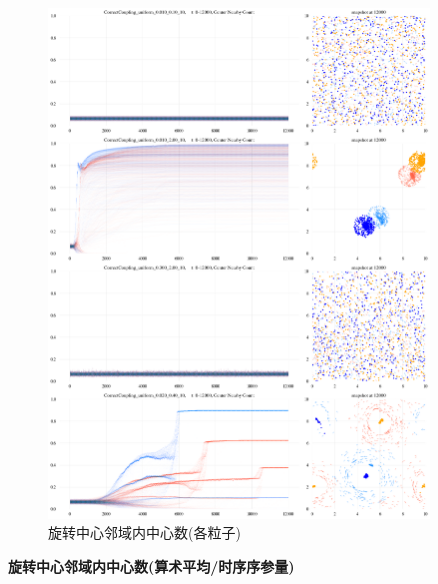 \documentclass{article}
\begin{document}
\begin{figure}[H]
	\centering
	\includegraphics[width=0.9\textwidth]{./figs/centerNearbyCounts.png}
	\caption{旋转中心邻域内中心数(各粒子)}
	\label{fig:fig234t.4.1}
\end{figure}

\newpage
\noindent\textbf{旋转中心邻域内中心数(算术平均/时序序参量)}
\end{document}

